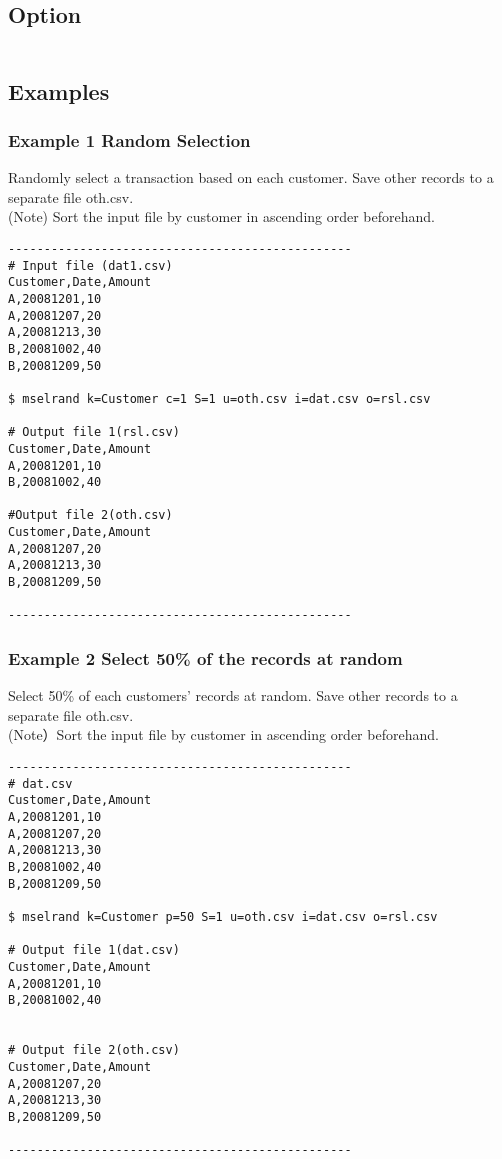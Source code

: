 \documentclass[a4paper]{jarticle}
\begin{document}
\subsection*{Option}
\begin{table}[htbp]
{\small
\begin{tabular}{ll}
\end{tabular} 
}
\end{table} 

\subsection*{Examples}
\subsubsection*{Example 1 Random Selection}
Randomly select a transaction based on each customer.  Save other records to a separate file oth.csv. \\
(Note) Sort the input file by customer in ascending order beforehand. 

\begin{verbatim}
------------------------------------------------
# Input file (dat1.csv)
Customer,Date,Amount
A,20081201,10
A,20081207,20
A,20081213,30
B,20081002,40
B,20081209,50

$ mselrand k=Customer c=1 S=1 u=oth.csv i=dat.csv o=rsl.csv

# Output file 1(rsl.csv)
Customer,Date,Amount
A,20081201,10
B,20081002,40

#Output file 2(oth.csv)
Customer,Date,Amount
A,20081207,20
A,20081213,30
B,20081209,50

------------------------------------------------
\end{verbatim}

\subsubsection*{Example 2 Select 50\% of the records at random}
Select 50\% of each customers' records at random. Save other records to a separate file oth.csv. \\
(Note）Sort the input file by customer in ascending order beforehand. 

\begin{verbatim}
------------------------------------------------
# dat.csv
Customer,Date,Amount
A,20081201,10
A,20081207,20
A,20081213,30
B,20081002,40
B,20081209,50

$ mselrand k=Customer p=50 S=1 u=oth.csv i=dat.csv o=rsl.csv

# Output file 1(dat.csv)
Customer,Date,Amount
A,20081201,10
B,20081002,40


# Output file 2(oth.csv)
Customer,Date,Amount
A,20081207,20
A,20081213,30
B,20081209,50

------------------------------------------------
\end{verbatim}
\end{document}
